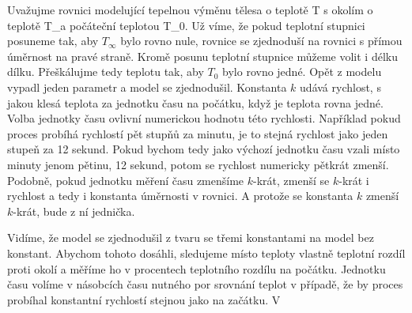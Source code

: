 Uvažujme rovnici modelující tepelnou výměnu tělesa o teplotě T s okolím o teplotě T_\infty a počáteční teplotou T_0. Už víme, že pokud teplotní stupnici posuneme tak, aby $T_\infty$ bylo rovno nule, rovnice se zjednoduší na rovnici s přímou úměrnost na pravé straně. Kromě posunu teplotní stupnice můžeme volit i délku dílku. Přeškálujme tedy teplotu tak, aby $T_0$ bylo rovno jedné. Opět z modelu vypadl jeden parametr a model se zjednodušil. Konstanta $k$ udává rychlost, s jakou klesá teplota za jednotku času na počátku, když je teplota rovna jedné. Volba jednotky času ovlivní numerickou hodnotu této rychlosti. Například pokud proces probíhá rychlostí pět stupňů za minutu, je to stejná rychlost jako jeden stupeň za 12 sekund. Pokud bychom tedy jako výchozí jednotku času vzali místo minuty jenom pětinu, 12 sekund, potom se rychlost numericky pětkrát zmenší. Podobně, pokud jednotku měření času zmenšíme $k$-krát, zmenší se $k$-krát i rychlost a tedy i konstanta úměrnosti v rovnici. A protože se konstanta $k$ zmenší $k$-krát, bude z ní jednička.

Vidíme, že model se zjednodušil z tvaru se třemi konstantami na model bez konstant. Abychom tohoto dosáhli, sledujeme místo teploty vlastně teplotní rozdíl proti okolí a měříme ho v procentech teplotního rozdílu na počátku. Jednotku času volíme v násobcích času nutného por srovnání teplot v případě, že by proces probíhal konstantní rychlostí stejnou jako na začátku. V

